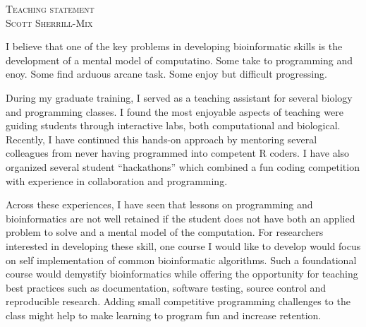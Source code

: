 \documentclass[]{article}
\date{\today}
\begin{document}

\begin{center}
\fontsize{19}{21}\textsc{Teaching statement}\\
\vspace{.4em}
\fontsize{14}{17}\textsc{Scott Sherrill-Mix}
\end{center}
I believe that one of the key problems in developing bioinformatic skills is the development of a mental model of computatino. Some take to programming and enoy. Some find arduous arcane task. Some enjoy but difficult progressing.

 During my graduate training, I served as a teaching assistant for several biology and programming classes. I found the most enjoyable aspects of teaching were guiding students through interactive labs, both computational and biological. Recently, I have continued this hands-on approach by mentoring several colleagues from never having programmed into competent R coders. I have also organized several student ``hackathons'' which combined a fun coding competition with experience in collaboration and programming.
 
 Across these experiences, I have seen that lessons on programming and bioinformatics are not well retained if the student does not have both an applied problem to solve and a mental model of the computation.  For researchers interested in developing these skill, one course I would like to develop would focus on self implementation of common bioinformatic algorithms. Such a foundational course would demystify bioinformatics while offering the opportunity for teaching best practices such as documentation, software testing, source control and reproducible research. Adding small competitive programming challenges to the class might help to make learning to program fun and increase retention.
\end{document}
